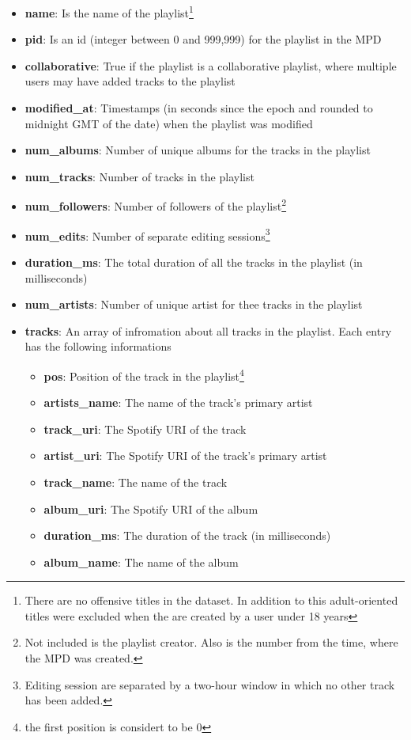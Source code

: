 \begin{itemize}
    \item \textbf{name}: Is the name of the playlist\footnote{There are no offensive titles in the dataset. In addition to this adult-oriented titles were excluded when the are created by a user under 18 years}
    \item \textbf{pid}: Is an id (integer between 0 and 999,999) for the playlist in the MPD
    \item \textbf{collaborative}: True if the playlist is a collaborative playlist, where multiple users may have added tracks to the playlist
    \item \textbf{modified\_at}: Timestamps (in seconds since the epoch and rounded to midnight GMT of the date) when the playlist was modified
    \item \textbf{num\_albums}: Number of unique albums for the tracks in the playlist
    \item \textbf{num\_tracks}: Number of tracks in the playlist
    \item \textbf{num\_followers}: Number of followers of the playlist\footnote{Not included is the playlist creator. Also is the number from the time, where the MPD was created.}
    \item \textbf{num\_edits}: Number of separate editing sessions\footnote{Editing session are separated by a two-hour window in which no other track has been added.}
    \item \textbf{duration\_ms}: The total duration of all the tracks in the playlist (in milliseconds)
    \item \textbf{num\_artists}: Number of unique artist for thee tracks in the playlist
    \item \textbf{tracks}: An array of infromation about all tracks in the playlist. Each entry has the following informations
    \begin{itemize}
        \item \textbf{pos}: Position of the track in the playlist\footnote{the first position is considert to be 0}
        \item \textbf{artists\_name}: The name of the track's primary artist
        \item \textbf{track\_uri}: The Spotify URI of the track
        \item \textbf{artist\_uri}: The Spotify URI of the track's primary artist
        \item \textbf{track\_name}: The name of the track
        \item \textbf{album\_uri}: The Spotify URI of the album
        \item \textbf{duration\_ms}: The duration of the track (in milliseconds)
        \item \textbf{album\_name}: The name of the album
    \end{itemize}
\end{itemize}
